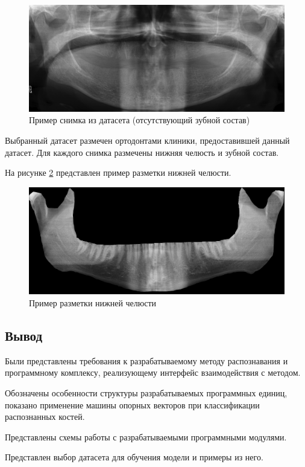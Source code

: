 \begin{figure}[H]
	\centering
	\includegraphics[width=\textwidth]{img/example_teethless.png}
	\caption{Пример снимка из датасета (отсутствующий зубной состав)}
	\label{fig:example_teethless}
\end{figure}

Выбранный датасет размечен ортодонтами клиники, предоставившей данный датасет. Для каждого снимка размечены нижняя челюсть и зубной состав.

На рисунке \ref{fig:example_mandible} представлен пример разметки нижней челюсти.

\begin{figure}[H]
	\centering
	\includegraphics[width=\textwidth]{img/example_mandible.png}
	\caption{Пример разметки нижней челюсти}
	\label{fig:example_mandible}
\end{figure}

\subsection*{Вывод}

Были представлены требования к разрабатываемому методу распознавания и программному комплексу, реализующему интерфейс взаимодействия с методом.

Обозначены особенности структуры разрабатываемых программных единиц, показано применение машины опорных векторов при классификации распознанных костей.

Представлены схемы работы с разрабатываемыми программными модулями.

Представлен выбор датасета для обучения модели и примеры из него.